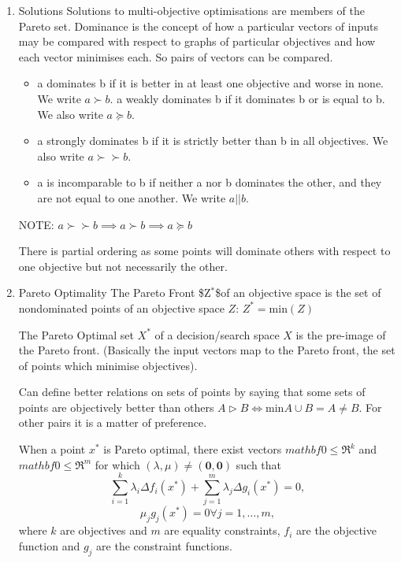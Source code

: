 \documentclass[11pt]{article}
\begin{document}
\begin{enumerate}
\item Solutions
\label{sec:org5f23cb0}
Solutions to multi-objective optimisations are members of the Pareto
set.
Dominance is the concept of how a particular vectors of inputs may be
compared with respect to graphs of particular objectives and how each
vector minimises each. So pairs of vectors can be compared.

\begin{itemize}
\item a dominates b if it is better in at least one objective and worse in
none. We write \(a \succ b\).
a weakly dominates b if it dominates b or is equal to b. We also
write \(a \succeq b\).
\item a strongly dominates b if it is strictly better than b in all objectives. We also write
\(a \succ\succ  b\).
\item a is incomparable to b if neither a nor b dominates the other, and they are not equal
to one another. We write \(a || b\).
\end{itemize}
NOTE: \(a \succ\succ b \implies a \succ b \implies a \succeq b\)

There is partial ordering as some points will dominate others with
respect to one objective but not necessarily the other. 

\item Pareto Optimality
\label{sec:org03f159b}
The Pareto Front \$Z\(^{\text{*}}\)\$of an objective space is the set of nondominated
points of an objective space \(Z\): \(Z^{*} = \text{min}(Z)\)

The Pareto Optimal set \(X^*\) of a decision/search space \(X\) is the
pre-image of the Pareto front. (Basically the input vectors map to the
Pareto front, the set of points which minimise objectives).

Can define better relations on sets of points  by saying that some
sets of points are objectively better than others 
\(A \rhd B \Leftrightarrow \text{min} A \cup B = A \neq B\).
For other pairs it is a matter of preference.

When a point \(x^*\) is Pareto optimal, there exist vectors 
\(mathbf{0}\leq \mathfrak{R}^{k}\) and \(mathbf{0}\leq \mathfrak{R}^{m}\)
for which \((\lambda,\mu) \neq (\mathbf{0}, \mathbf{0})\) such that
\[ \sum_{i=1}^{k} \lambda_{i} \Delta f_{i}(x^*) + \sum_{j=1}^{m}
\lambda_{j} \Delta g_{i}(x^*) = 0, \]
\[ \mu_j g_j(x^*) = 0 \forall j = 1,\ldots,m, \]
where \(k\) are objectives and \(m\) are equality constraints, \(f_i\) are
the objective function and \(g_j\) are the constraint functions.






\end{enumerate}
\end{document}
